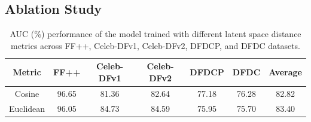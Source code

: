 \documentclass[final,5p,times]{elsarticle}
\begin{document}
\subsection{Ablation Study}

\begin{table}[htb]\rmfamily
    \centering
    \caption{AUC (\%) performance of the model trained with different latent space distance metrics across FF++, Celeb-DFv1, Celeb-DFv2, DFDCP, and DFDC datasets.}
    \label{tab4}
\begin{tabular}{ccccccc}\toprule                    													            														

Metric& \multicolumn{1}{c}{FF++} & Celeb-DFv1&                         Celeb-DFv2& DFDCP&                         DFDC& Average
\\\midrule Cosine& \multicolumn{1}{c}{96.65 }                        & \multicolumn{1}{c}{81.36 } & \multicolumn{1}{c}{82.64 } & \multicolumn{1}{c}{77.18 } & \multicolumn{1}{c}{76.28 } & \multicolumn{1}{c}{82.82 
}  \\ 
Euclidean& \multicolumn{1}{c}{96.05 }                        & \multicolumn{1}{c}{84.73 }    & \multicolumn{1}{c}{84.59 }     & \multicolumn{1}{c}{75.95 }    & \multicolumn{1}{c}{75.70 }     & \multicolumn{1}{c}{83.40 
}         \\ \bottomrule 
\end{tabular}
\end{table}
\end{document}
